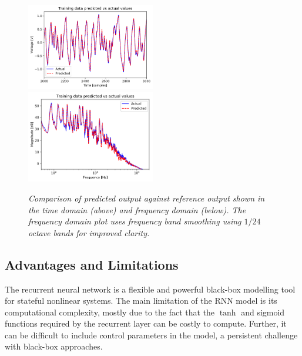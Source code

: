 \documentclass[twoside,a4paper]{article}
\begin{document}
\begin{figure}
    \centering
    \includegraphics[width=0.5\textwidth]{TimeDomain.png}
    \centering
    \includegraphics[width=0.5\textwidth]{FreqDomain.png}
    \caption{\label{fig:freqandtime} {\it Comparison of
        predicted output against reference output shown in
        the time domain (above) and frequency domain (below).
        The frequency domain plot uses frequency band smoothing
        using $1/24$ octave bands for improved clarity.}}
\end{figure}

\subsection{Advantages and Limitations}
The recurrent neural network is a flexible and powerful
black-box modelling tool for stateful nonlinear systems.
The main limitation of the RNN model is its computational
complexity, mostly due to the fact that the $\tanh$ and
sigmoid functions required by the recurrent layer can be
costly to compute. Further, it can be difficult to include
control parameters in the model, a persistent challenge with
black-box approaches.
\end{document}
